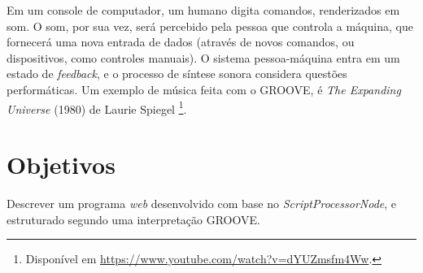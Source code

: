 Em um console de computador, um humano digita comandos, renderizados em som. O som, por sua vez, será percebido pela pessoa que controla a máquina, que fornecerá uma nova entrada de dados (através de novos comandos, ou dispositivos, como controles manuais). O sistema pessoa-máquina entra em um estado de \emph{feedback}, e o processo de síntese sonora considera questões performáticas. Um exemplo de música feita com o GROOVE, é \emph{The Expanding Universe} (1980) de Laurie Spiegel \cite{reynolds_resident_2012}\footnote{Disponível em \url{https://www.youtube.com/watch?v=dYUZmsfm4Ww}.}.

\section{Objetivos}

Descrever um programa \emph{web} desenvolvido com base no \emph{ScriptProcessorNode}, e estruturado segundo uma interpretação GROOVE.


